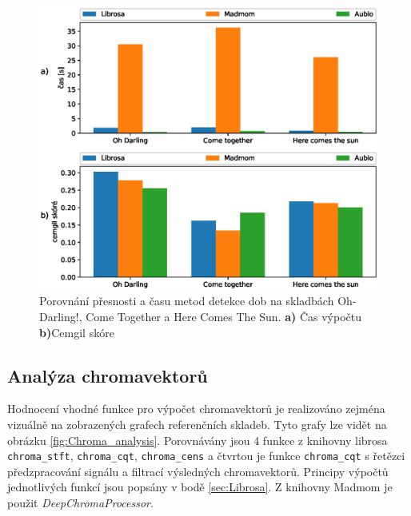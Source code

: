 \begin{figure}[H]
    \centering
    \includegraphics[width = 1\linewidth]{obrazky/Beat_tracking_time_and_cemgil_graphs.eps}
    \caption{Porovnání přesnosti a času metod detekce dob na skladbách Oh-Darling!, Come Together a Here Comes The Sun. \textbf{a)} Čas výpočtu \textbf{b)}Cemgil skóre}
    \label{fig:Beat_tracking_time_and_cemgil}
\end{figure}

\subsection{Analýza chromavektorů}

Hodnocení vhodné funkce pro výpočet chromavektorů je realizováno zejména vizuálně na zobrazených grafech referenčních skladeb. Tyto grafy lze vidět na obrázku \ref{fig:Chroma_analysis}. Porovnávány jsou 4 funkce z knihovny librosa \texttt{chroma\_stft}, \texttt{chroma\_cqt}, \texttt{chroma\_cens} a čtvrtou je funkce \texttt{chroma\_cqt} s řetězci předzpracování signálu a filtrací výsledných chromavektorů. Principy výpočtů jednotlivých funkcí jsou popsány v bodě \ref{sec:Librosa}. Z knihovny Madmom je použit \textit{DeepChromaProcessor}.

